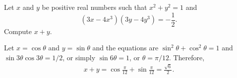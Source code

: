 \documentclass[11pt]{article}
\theoremstyle{definition}
\begin{document}
%




\begin{question}[name={2012 HMMT, Guts, Problem 18}]
	Let $x$ and $y$ be positive real numbers such that $x^2+y^2=1$ and $$(3x-4x^3)(3y-4y^3)=-\frac{1}{2}.$$ Compute $x+y$.
\end{question}




\begin{solution}%
	Let $x=\cos \theta$ and $y=\sin \theta$ and the equations are $\sin^2\theta+\cos^2\theta=1$ and $\sin 3\theta \cos 3\theta = 1/2$, or simply $\sin 6\theta=1$, or $\theta = \pi/12$. Therefore,
	\begin{align*}
		x+y = \cos \frac{\pi}{12}+\sin \frac{\pi}{12} = \boxed{\frac{\sqrt{6}}{2}}.
	\end{align*}
\end{solution}

%
%
%
%
%
%
%
%
%
%
%
%
%
%	
%
%
%
%
%	
%
%
%
%
%
%	
%
%
%
%
%	
%
%
%
%
%
%	
%
%
%
%
%	
%
%
%
%
%
\end{document}
